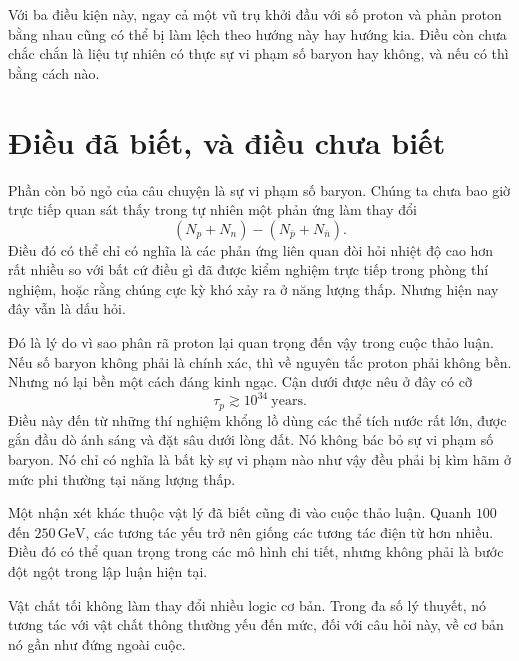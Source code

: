 \begin{classroomqa}
\end{classroomqa}

Với ba điều kiện này, ngay cả một vũ trụ khởi đầu với số proton và phản proton bằng nhau cũng có thể bị làm lệch theo hướng này hay hướng kia. Điều còn chưa chắc chắn là liệu tự nhiên có thực sự vi phạm số baryon hay không, và nếu có thì bằng cách nào.

\section{Điều đã biết, và điều chưa biết}

Phần còn bỏ ngỏ của câu chuyện là sự vi phạm số baryon. Chúng ta chưa bao giờ trực tiếp quan sát thấy trong tự nhiên một phản ứng làm thay đổi
\[
(N_p+N_n)-(N_{\bar p}+N_{\bar n}).
\]
Điều đó có thể chỉ có nghĩa là các phản ứng liên quan đòi hỏi nhiệt độ cao hơn rất nhiều so với bất cứ điều gì đã được kiểm nghiệm trực tiếp trong phòng thí nghiệm, hoặc rằng chúng cực kỳ khó xảy ra ở năng lượng thấp. Nhưng hiện nay đây vẫn là dấu hỏi.

Đó là lý do vì sao phân rã proton lại quan trọng đến vậy trong cuộc thảo luận. Nếu số baryon không phải là chính xác, thì về nguyên tắc proton phải không bền. Nhưng nó lại bền một cách đáng kinh ngạc. Cận dưới được nêu ở đây có cỡ
\[
\tau_p \gtrsim 10^{34}\ \text{years}.
\]
Điều này đến từ những thí nghiệm khổng lồ dùng các thể tích nước rất lớn, được gắn đầu dò ánh sáng và đặt sâu dưới lòng đất. Nó không bác bỏ sự vi phạm số baryon. Nó chỉ có nghĩa là bất kỳ sự vi phạm nào như vậy đều phải bị kìm hãm ở mức phi thường tại năng lượng thấp.

Một nhận xét khác thuộc vật lý đã biết cũng đi vào cuộc thảo luận. Quanh \(100\) đến \(250\,\mathrm{GeV}\), các tương tác yếu trở nên giống các tương tác điện từ hơn nhiều. Điều đó có thể quan trọng trong các mô hình chi tiết, nhưng không phải là bước đột ngột trong lập luận hiện tại.

Vật chất tối không làm thay đổi nhiều logic cơ bản. Trong đa số lý thuyết, nó tương tác với vật chất thông thường yếu đến mức, đối với câu hỏi này, về cơ bản nó gần như đứng ngoài cuộc.

